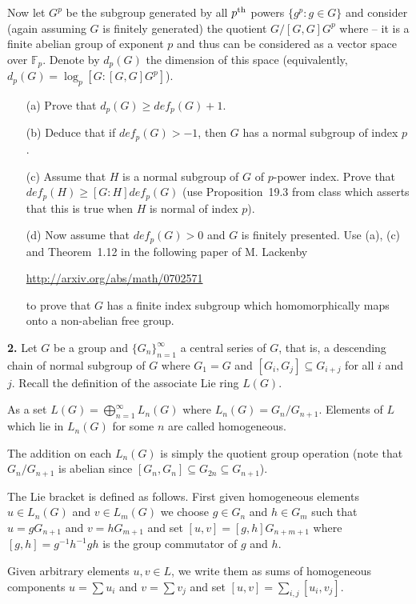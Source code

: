 \documentclass[12pt]{amsart}
\begin{document}
Now let $G^p$ be the subgroup generated by all $p^{\rm th}$ powers $\{g^p: g\in G\}$ and
consider (again assuming $G$ is finitely generated) the quotient $G/[G,G]G^p$ where  -- it is 
a finite abelian group of exponent $p$ and thus can be considered as a vector space over $\mathbb F_p$. Denote
by $d_p(G)$ the dimension of this space (equivalently, $d_p(G)=\log_p[G:[G,G]G^p]$).
\begin{itemize}
\item[(a)] Prove that $d_p(G)\geq def_p(G)+1$.
\item[(b)] Deduce that if $def_p(G)>-1$, then $G$ has a normal subgroup of index $p$. 
\item[(c)] Assume that $H$ is a normal subgroup of $G$ of $p$-power index. Prove that $def_p(H)\geq [G:H] def_p(G)$
(use Proposition~19.3 from class which asserts that this is true when $H$ is normal of index $p$). 
\item[(d)] Now assume that $def_p(G)>0$ and $G$ is finitely presented. Use (a), (c)
and Theorem~1.12 in the following paper of M. Lackenby 
\skv
\centerline{\url{http://arxiv.org/abs/math/0702571}}
\skv
to prove that $G$ has a finite index subgroup which homomorphically maps
onto a non-abelian free group.
\end{itemize}
\skv
{\bf 2.} Let $G$ be a group and $\{G_n\}_{n=1}^{\infty}$ a central series of $G$, that is, a descending chain of normal subgroup of $G$ where $G_1=G$ and $[G_i,G_j]\subseteq G_{i+j}$ for all $i$ and $j$. Recall the definition of the associate Lie ring $L(G)$.

As a set $L(G)=\bigoplus\limits_{n=1}^{\infty}L_n(G)$ where $L_n(G)=G_n/G_{n+1}$. Elements of $L$ which lie
in $L_n(G)$ for some $n$ are called homogeneous.

The addition on each $L_n(G)$ is simply the quotient group operation (note that $G_n/G_{n+1}$ is abelian since 
$[G_n,G_n]\subseteq G_{2n}\subseteq G_{n+1}$). 

The Lie bracket is defined as follows. First given homogeneous elements $u\in L_n(G)$ and $v\in L_m(G)$ we choose $g\in G_n$ and $h\in G_m$ such that $u=gG_{n+1}$ and $v=hG_{m+1}$ and set $[u,v]=[g,h]G_{n+m+1}$
where $[g,h]=g^{-1}h^{-1}gh$ is the group commutator of $g$ and $h$.

Given arbitrary elements $u,v\in L$, we write them as sums of homogeneous components $u=\sum u_i$ and
$v=\sum v_j$ and set $[u,v]=\sum\limits_{i,j}[u_i,v_j]$.
\end{document}
